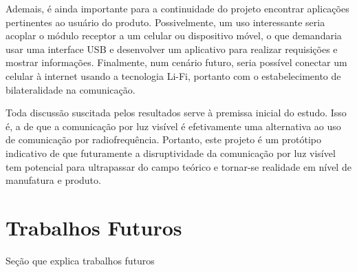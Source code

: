 	Ademais, é ainda importante para a continuidade do projeto encontrar aplicações pertinentes ao usuário do produto. Possivelmente, um uso interessante seria acoplar o módulo receptor a um celular ou dispositivo móvel, o que demandaria usar uma interface USB e desenvolver um aplicativo para realizar requisições e mostrar informações. Finalmente, num cenário futuro, seria possível conectar um celular à internet usando a tecnologia Li-Fi, portanto com o estabelecimento de bilateralidade na comunicação.
	
	Toda discussão suscitada pelos resultados serve à premissa inicial do estudo. Isso é, a de que a comunicação por luz visível é efetivamente uma alternativa ao uso de comunicação por radiofrequência. Portanto, este projeto é um protótipo indicativo de que futuramente a disruptividade da comunicação por luz visível tem potencial para ultrapassar do campo teórico e tornar-se realidade em nível de manufatura e produto. 
	
	\section{Trabalhos Futuros}
	
	Seção que explica trabalhos futuros